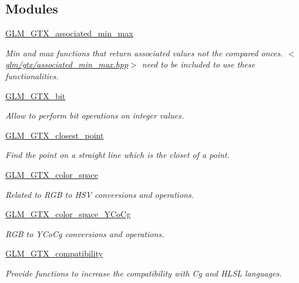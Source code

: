 \subsection*{Modules}
\begin{DoxyCompactItemize}
\item 
\hyperlink{group__gtx__associated__min__max}{G\+L\+M\+\_\+\+G\+T\+X\+\_\+associated\+\_\+min\+\_\+max}
\begin{DoxyCompactList}\small\item\em Min and max functions that return associated values not the compared onces. $<$\hyperlink{associated__min__max_8hpp}{glm/gtx/associated\+\_\+min\+\_\+max.\+hpp}$>$ need to be included to use these functionalities. \end{DoxyCompactList}\item 
\hyperlink{group__gtx__bit}{G\+L\+M\+\_\+\+G\+T\+X\+\_\+bit}
\begin{DoxyCompactList}\small\item\em Allow to perform bit operations on integer values. \end{DoxyCompactList}\item 
\hyperlink{group__gtx__closest__point}{G\+L\+M\+\_\+\+G\+T\+X\+\_\+closest\+\_\+point}
\begin{DoxyCompactList}\small\item\em Find the point on a straight line which is the closet of a point. \end{DoxyCompactList}\item 
\hyperlink{group__gtx__color__space}{G\+L\+M\+\_\+\+G\+T\+X\+\_\+color\+\_\+space}
\begin{DoxyCompactList}\small\item\em Related to R\+GB to H\+SV conversions and operations. \end{DoxyCompactList}\item 
\hyperlink{group__gtx__color__space___y_co_cg}{G\+L\+M\+\_\+\+G\+T\+X\+\_\+color\+\_\+space\+\_\+\+Y\+Co\+Cg}
\begin{DoxyCompactList}\small\item\em R\+GB to Y\+Co\+Cg conversions and operations. \end{DoxyCompactList}\item 
\hyperlink{group__gtx__compatibility}{G\+L\+M\+\_\+\+G\+T\+X\+\_\+compatibility}
\begin{DoxyCompactList}\small\item\em Provide functions to increase the compatibility with Cg and H\+L\+SL languages. \end{DoxyCompactList}\item 

\end{DoxyCompactItemize}
